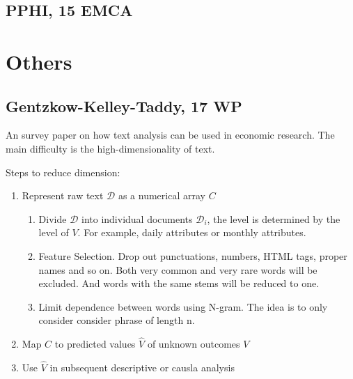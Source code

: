 \documentclass{book}
\theoremstyle{plain}
\theoremstyle{definition}
\begin{document}
\section{PPHI, 15 EMCA} %
\label{sec:pphi_15_emca}





\chapter{Others} %
\label{cha:others}


\section{Gentzkow-Kelley-Taddy, 17 WP} %
\label{sec:gentzkow_kelley_taddy_17_wp}

\noindent
\textbf{}

An survey paper on how text analysis can be used in economic research. 
The main difficulty is the high-dimensionality of text.

\noindent
Steps to reduce dimension:
\begin{enumerate}
	\item Represent raw text $\mathcal{D}$ as a numerical array $C$
	\begin{enumerate}
		\item Divide $\mathcal D$ into individual documents $\mathcal D_i$, the level is determined by the level of $V$. For example, daily attributes or monthly attributes.
		\item Feature Selection. Drop out punctuations, numbers, HTML tags, proper names and so on. Both very common and very rare words will be excluded. And words with the same stems will be reduced to one.
		\item Limit dependence between words using N-gram. The idea is to only consider consider phrase of length n.
	\end{enumerate}
	\item Map $C$ to predicted values $\hat V$ of unknown outcomes $V$
	\item Use $\hat V$ in subsequent descriptive or causla analysis
\end{enumerate}
\end{document}
